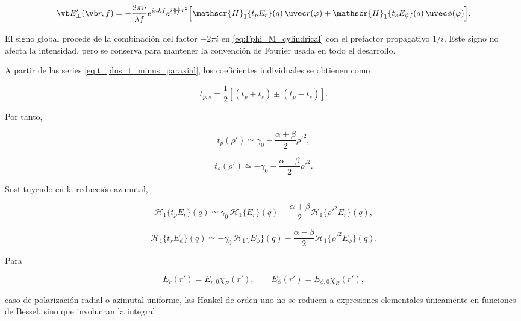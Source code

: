 \begin{equation}
  \vb E'_\perp(\vb r, f)
  =
  -\frac{2\pi n}{\lambda f}
  e^{inkf}e^{i\frac{nk}{2f}r^2}
  \Big[
    \mathscr{H}_1\{t_p E_r\}(q)\,\uvec r(\varphi)
    +
    \mathscr{H}_1\{t_s E_\phi\}(q)\,\uvec\phi(\varphi)
  \Big].
  \label{eq:E_field_cylindrical_azimuthal}
\end{equation}

El signo global procede de la combinación del factor $-2\pi i$ en \eqref{eq:Fphi_M_cylindrical} con el prefactor propagativo $1/i$. Este signo no afecta la intensidad, pero se conserva para mantener la convención de Fourier usada en todo el desarrollo.

A partir de las series \eqref{eq:t_plus_t_minus_paraxial}, los coeficientes individuales se obtienen como

\begin{equation}
t_{p,s}
=
\frac{1}{2}
\left[
(t_p+t_s)\pm(t_p-t_s)
\right].
\end{equation}

Por tanto,

\begin{equation}
t_p(\rho')
\simeq
\gamma_0
-
\frac{\alpha+\beta}{2}\rho'^2,
\label{eq:tp_paraxial_from_pm}
\end{equation}

\begin{equation}
t_s(\rho')
\simeq
-\gamma_0
-
\frac{\alpha-\beta}{2}\rho'^2.
\label{eq:ts_paraxial_from_pm}
\end{equation}

Sustituyendo en la reducción azimutal,

\begin{equation}
\mathscr H_1\{t_p E_r\}(q)
\simeq
\gamma_0\,\mathscr H_1\{E_r\}(q)
-
\frac{\alpha+\beta}{2}
\mathscr H_1\{\rho'^2 E_r\}(q),
\label{eq:H1_tp_Er_paraxial}
\end{equation}

\begin{equation}
\mathscr H_1\{t_s E_\phi\}(q)
\simeq
-\gamma_0\,\mathscr H_1\{E_\phi\}(q)
-
\frac{\alpha-\beta}{2}
\mathscr H_1\{\rho'^2 E_\phi\}(q).
\label{eq:H1_ts_Ephi_paraxial}
\end{equation}

Para

\begin{equation}
E_r(r')=E_{r,0}\chi_R(r'),
\qquad
E_\phi(r')=E_{\phi,0}\chi_R(r'),
\end{equation}

caso de polarización radial o azimutal uniforme, las Hankel de orden uno no se reducen a expresiones elementales únicamente en funciones de Bessel, sino que involucran la integral

